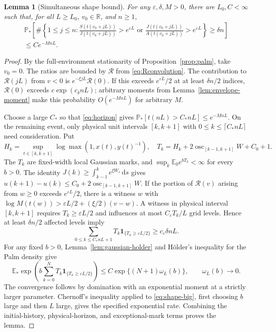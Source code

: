 \documentclass[11pt,reqno]{amsart}
\theoremstyle{plain}
\newtheorem{lemma}[theorem]{Lemma}
\theoremstyle{definition}
\theoremstyle{remark}
\newcommand{\R}{\mathbb R}
\newcommand{\E}{\mathbb E}
\newcommand{\Pp}{\mathbb P}
\newcommand{\Osc}{\operatorname{osc}}
\newcommand{\1}{\mathbf{1}}
\newcommand{\dd}{\,\mathrm d}
\begin{document}
\begin{lemma}[Simultaneous shape bound]\label{lem:shape}
For any $\varepsilon,\delta,M>0$, there are $L_0,C<\infty$ such that, for all $L\ge L_0$, $v_0\in\R$, and $n\ge1$,
\begin{multline}\label{eq:shape}
\Pp_*\left[\#\left\{1\le j\le n:
\frac{S(t(v_0+jL))}{J(t(v_0+jL))}>e^{\varepsilon L}
\text{ or }
\frac{J(t(v_0+jL))}{A(t(v_0+jL))}>e^{\varepsilon L}\right\}\ge\delta n\right]\\
\le C e^{-MnL}.
\end{multline}
\end{lemma}
\begin{proof}
By the full-environment stationarity of Proposition~\ref{prop:palm}, take $v_0=0$. The ratios are bounded by $\mathcal R$ from \eqref{eq:Rconvolution}. The contribution to $\mathcal R(jL)$ from $v<0$ is $e^{-\xi jL}\mathcal R(0)$. If this exceeds $e^{\varepsilon L}/2$ at at least $\delta n/2$ indices, $\mathcal R(0)$ exceeds $c\exp(c_\delta nL)$; arbitrary moments from Lemma~\ref{lem:envelope-moment} make this probability $O(e^{-MnL})$ for arbitrary $M$.

Choose a large $C_*$ so that \eqref{eq:horizon} gives $\Pp_*[t(nL)>C_*nL]\le e^{-MnL}$. On the remaining event, only physical unit intervals $[k,k+1]$ with $0\le k\le\lceil C_*nL\rceil$ need consideration. Put
\[
H_k=\sup_{t\in[k,k+1]}\log\max(1,x(t),y(t)^{-1}),\quad
T_k=H_k+2\Osc_{[k-1,k+1]}W+C_0+1.
\]
The $T_k$ are fixed-width local Gaussian marks, and $\sup_k\E_0e^{bT_k}<\infty$ for every $b>0$. The identity $J(k)\ge\int_{k-1}^ke^{\xi W_s}\dd s$ gives
$u(k+1)-u(k)\le C_0+2\Osc_{[k-1,k+1]}W$.
If the portion of $\mathcal R(v)$ arising from $w\ge0$ exceeds $e^{\varepsilon L}/2$, there is a witness $w$ with
$\log M(t(w))>\varepsilon L/2+(\xi/2)(v-w)$. A witness in physical interval $[k,k+1]$ requires $T_k\ge\varepsilon L/2$ and influences at most $C_\varepsilon T_k/L$ grid levels. Hence at least $\delta n/2$ affected levels imply
\begin{equation}\label{eq:shape-big}
\sum_{0\le k\le C_*nL+1}T_k\1_{\{T_k\ge\varepsilon L/2\}}\ge c_\varepsilon\delta nL.
\end{equation}
For any fixed $b>0$, Lemma~\ref{lem:gaussian-holder} and H\"older's inequality for the Palm density give
\[
\E_*\exp\left(b\sum_{k=0}^NT_k\1_{\{T_k\ge\varepsilon L/2\}}\right)
\le C\exp\{(N+1)\omega_L(b)\},\qquad \omega_L(b)\longrightarrow0.
\]
The convergence follows by domination with an exponential moment at a strictly larger parameter. Chernoff's inequality applied to \eqref{eq:shape-big}, first choosing $b$ large and then $L$ large, gives the specified exponential rate. Combining the initial-history, physical-horizon, and exceptional-mark terms proves the lemma.
\end{proof}
\end{document}
